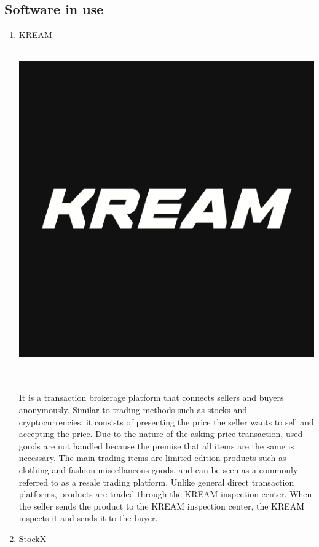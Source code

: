 \documentclass[conference]{IEEEtran}
\begin{document}
\subsection{Software in use}
\begin{enumerate}
	\item{KREAM}\\
	\\
	\centerline{\includegraphics[scale=0.2]{pics/KREAM.png}}\\\\
It is a transaction brokerage platform that connects sellers and buyers anonymously. Similar to trading methods such as stocks and cryptocurrencies, it consists of presenting the price the seller wants to sell and accepting the price. Due to the nature of the asking price transaction, used goods are not handled because the premise that all items are the same is necessary. The main trading items are limited edition products such as clothing and fashion miscellaneous goods, and can be seen as a commonly referred to as a resale trading platform. Unlike general direct transaction platforms, products are traded through the KREAM inspection center. When the seller sends the product to the KREAM inspection center, the KREAM inspects it and sends it to the buyer.\\
	\item{StockX}\\

\end{enumerate}
\end{document}
